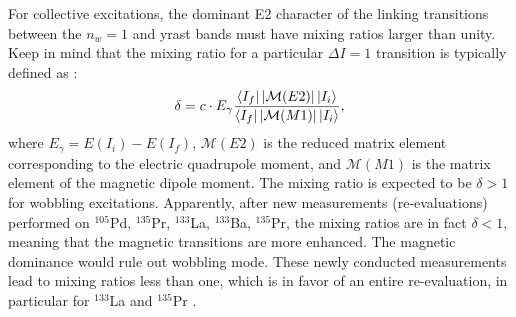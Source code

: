
For collective excitations, the dominant E2 character of the linking transitions between the $n_w=1$ and yrast bands must have mixing ratios larger than unity. Keep in mind that the mixing ratio for a particular $\Delta I=1$ transition is typically defined as \cite{krane1970determination,nomura2021examining}:
\begin{align}
    \delta=c\cdot E_\gamma\frac{\bra{I_f}|\mathcal{M}(E2)|\ket{I_i}}{\bra{I_f}|\mathcal{M}(M1)|\ket{I_i}}, 
\end{align}
where $E_\gamma=E(I_i)-E(I_f)$, $\mathcal{M}(E2)$ is the reduced matrix element corresponding to the electric quadrupole moment, and $\mathcal{M}(M1)$ is the matrix element of the magnetic dipole moment. The mixing ratio is expected to be $\delta >1$ for wobbling excitations. Apparently, after new measurements (re-evaluations) performed on $^{105}$Pd, $^{135}$Pr, $^{133}$La, $^{133}$Ba, $^{135}$Pr, the mixing ratios are in fact $\delta<1$, meaning that the magnetic transitions are more enhanced. The magnetic dominance would rule out wobbling mode. These newly conducted measurements lead to mixing ratios less than one, which is in favor of an entire re-evaluation, in particular for $^{133}$La \cite{hua2020comment} and $^{135}$Pr \cite{guo2021comment,lv2022evidence}.

